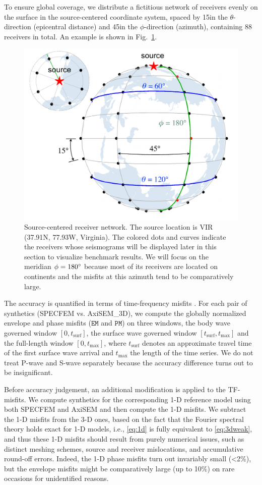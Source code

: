 \documentclass[extra]{gji}
\begin{document}
To ensure global coverage, we distribute a fictitious network of receivers 
evenly on the surface in the source-centered coordinate system, 
spaced by 15\degr in the $\theta$-direction (epicentral distance) and 
45\degr in the $\phi$-direction (azimuth), containing 88 receivers in total. 
An example is shown in Fig.~\ref{fig:rec}.

\begin{figure}
  \centering 
  \includegraphics[width=.44\textwidth]{fig/rec/recev.pdf} 
  \caption{Source-centered receiver network. The source location 
  is VIR (37.91\degr N, 77.93\degr W, Virginia). 
  The colored dots and curves indicate the receivers 
  whose seismograms will be displayed later in this section
  to visualize benchmark results. We will focus on the meridian $\phi=180\hbox{$^\circ$}$
  because most of its receivers are located on continents and the misfits 
  at this azimuth tend to be comparatively large. } 
  \label{fig:rec}
\end{figure}

The accuracy is quantified in terms of time-frequency misfits
\cite[TF-misfits,][]{kristekova2009time}. 
For each pair of synthetics (SPECFEM vs. AxiSEM\_3D), 
we compute the globally normalized 
envelope and phase misfits ($\mathtt{EM}$ and $\mathtt{PM}$) 
on three windows, the body wave governed window $[0,t_\text{surf}]$,
the surface wave governed window $[t_\text{surf},t_\text{max}]$ and 
the full-length window $[0,t_\text{max}]$, 
where $t_\text{surf}$ denotes an 
approximate travel time of the first surface wave arrival
and $t_\text{max}$ the length of the time series. 
We do not treat P-wave and S-wave separately because the accuracy
difference turns out to be insignificant.

Before accuracy judgement, an additional modification is applied to 
the TF-misfits. We compute synthetics for the corresponding
1-D reference model using both SPECFEM and AxiSEM 
\cite[the mature 1-D version,][]{nissen2014axisem} 
and then compute the 1-D misfits. 
We subtract the 1-D misfits from the 3-D ones, based on the fact
that the Fourier spectral theory holds exact for 1-D models, 
i.e., \eqref{eq:1d} is fully equivalent to \eqref{eq:3dweak}, 
and thus these 1-D misfits should result from purely numerical issues, 
such as distinct meshing schemes, source and receiver mislocations, and 
accumulative round-off errors.  
Indeed, the 1-D phase misfits turn out invariably small (\textless 2\%), 
but the envelope misfits might be comparatively large (up to 10\%)
on rare occasions for unidentified reasons. 
\end{document}

